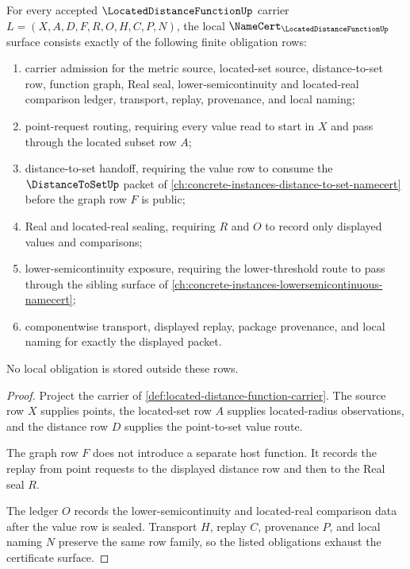 \begin{theorem}
\label{thm:located-distance-function-namecert-obligations}
For every accepted $\LocatedDistanceFunctionUp$ carrier $L=(X,A,D,F,R,O,H,C,P,N)$, the local $\NameCert_{\LocatedDistanceFunctionUp}$ surface consists exactly of the following finite obligation rows:
\begin{enumerate}
\item carrier admission for the metric source, located-set source, distance-to-set row, function graph, Real seal, lower-semicontinuity and located-real comparison ledger, transport, replay, provenance, and local naming;
\item point-request routing, requiring every value read to start in $X$ and pass through the located subset row $A$;
\item distance-to-set handoff, requiring the value row to consume the $\DistanceToSetUp$ packet of \autoref{ch:concrete-instances-distance-to-set-namecert} before the graph row $F$ is public;
\item Real and located-real sealing, requiring $R$ and $O$ to record only displayed values and comparisons;
\item lower-semicontinuity exposure, requiring the lower-threshold route to pass through the sibling surface of \autoref{ch:concrete-instances-lowersemicontinuous-namecert};
\item componentwise transport, displayed replay, package provenance, and local naming for exactly the displayed packet.
\end{enumerate}
No local obligation is stored outside these rows.
\end{theorem}
\begin{proof}
Project the carrier of \autoref{def:located-distance-function-carrier}. The source row $X$ supplies points, the located-set row $A$ supplies located-radius observations, and the distance row $D$ supplies the point-to-set value route.

The graph row $F$ does not introduce a separate host function. It records the replay from point requests to the displayed distance row and then to the Real seal $R$.

The ledger $O$ records the lower-semicontinuity and located-real comparison data after the value row is sealed. Transport $H$, replay $C$, provenance $P$, and local naming $N$ preserve the same row family, so the listed obligations exhaust the certificate surface.
\end{proof}

